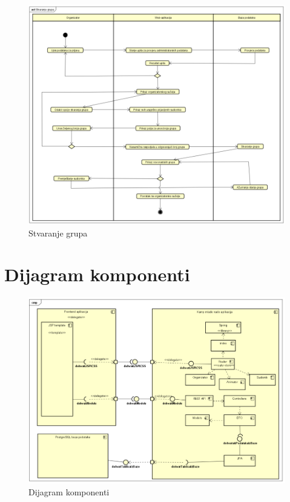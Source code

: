 \begin{figure}[H]
	\includegraphics[scale=0.8]{dokumentacija/dijagrami/activity-stvaranjeGrupa.PNG} 
	\centering
	\caption{Stvaranje grupa}
	\label{fig:promjene}
\end{figure}

\eject
\section{Dijagram komponenti}

\begin{figure}[H]
	\includegraphics[scale=0.8]{dokumentacija/dijagrami/dijagramKomponenti.PNG} 
	\centering
	\caption{Dijagram komponenti}
	\label{fig:promjene}
\end{figure}
